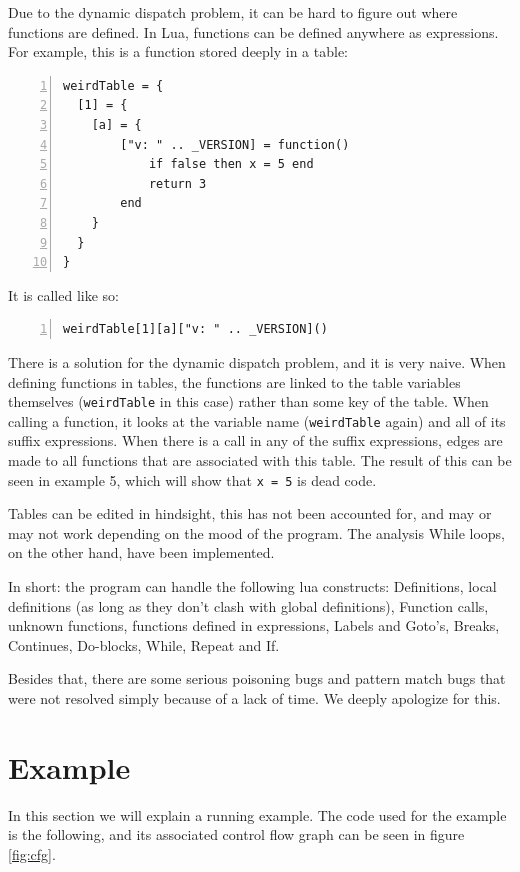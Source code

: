 \documentclass[10pt]{article}
\begin{document}
Due to the dynamic dispatch problem, it can be hard to figure out where functions are defined. In Lua, functions can be defined anywhere as expressions. For example, this is a function stored deeply in a table:
\begin{lstlisting}[frame=single,numbers=left,caption=Running with an example file]
weirdTable = {
  [1] = {
    [a] = {
        ["v: " .. _VERSION] = function()
            if false then x = 5 end
            return 3
        end
    }
  }
}
\end{lstlisting}
It is called like so:
\begin{lstlisting}[frame=single,numbers=left,caption=Running with an example file]
weirdTable[1][a]["v: " .. _VERSION]()
\end{lstlisting}

There is a solution for the dynamic dispatch problem, and it is very naive. When defining functions in tables, the functions are linked to the table variables themselves (\texttt{weirdTable} in this case) rather than some key of the table. When calling a function, it looks at the variable name (\texttt{weirdTable} again) and all of its suffix expressions. When there is a call in any of the suffix expressions, edges are made to all functions that are associated with this table. The result of this can be seen in example 5, which will show that \texttt{x = 5} is dead code.

Tables can be edited in hindsight, this has not been accounted for, and may or may not work depending on the mood of the program. The analysis While loops, on the other hand, have been implemented.

In short: the program can handle the following lua constructs: Definitions, local definitions (as long as they don't clash with global definitions), Function calls, unknown functions, functions defined in expressions, Labels and Goto's, Breaks, Continues, Do-blocks, While, Repeat and If.

Besides that, there are some serious poisoning bugs and pattern match bugs that were not resolved simply because of a lack of time. We deeply apologize for this.


\section{Example}
In this section we will explain a running example. The code used for the example is the following, and its associated control flow graph can be seen in figure \ref{fig:cfg}.
\end{document}
